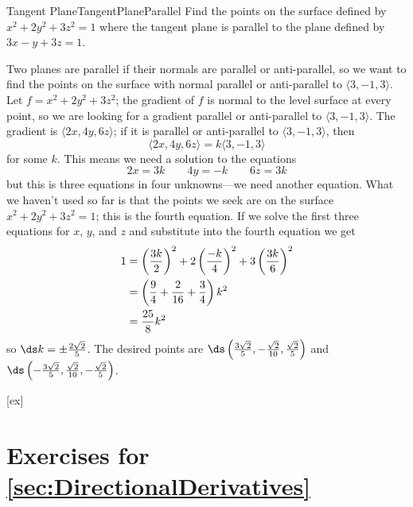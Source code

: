 \begin{example}{Tangent Plane}{TangentPlaneParallel}
Find the points on the surface defined by $x^2+2y^2+3z^2=1$
where the tangent plane  is parallel to the plane defined by
$3x-y+3z=1$.
\end{example}
\begin{solution}
Two planes are parallel if their normals are parallel or
anti-parallel, so we want to find the points on the surface with
normal parallel or anti-parallel to $\langle 3,-1,3\rangle$.
Let $f=x^2+2y^2+3z^2$; the gradient of $f$ is normal to the level
surface at every point, so we are looking for a gradient parallel 
or anti-parallel to
$\langle 3,-1,3\rangle$. The gradient is $\langle 2x,4y,6z\rangle$; if
it is parallel or anti-parallel to $\langle 3,-1,3\rangle$, then
$$\langle 2x,4y,6z\rangle=k\langle 3,-1,3\rangle$$
for some $k$. This means we need a solution to the equations
$$2x=3k\qquad 4y=-k\qquad 6z=3k$$
but this is three equations in four unknowns---we need another
equation. What we haven't used so far is that the points we seek are
on the surface $x^2+2y^2+3z^2=1$; this is the fourth equation. If we
solve the first three equations for $x$, $y$, and $z$ and substitute
into the fourth equation we get
\begin{align*}
1&=\left({3k\over2}\right)^2+2\left({-k\over4}\right)^2+3\left({3k\over6}\right)^2	\\
&=\left({9\over4}+{2\over16}+{3\over4}\right)k^2	\\
&={25\over8}k^2	\\
\end{align*}
so $\ds k=\pm{2\sqrt2\over 5}$. The desired points are
$\ds\left({3\sqrt2\over5},-{\sqrt2\over10},{\sqrt2\over 5}\right)$ 
and $\ds\left(-{3\sqrt2\over5},{\sqrt2\over10},-{\sqrt2\over
  5}\right)$.
\end{solution}


[ex]
\section*{Exercises for \ref{sec:DirectionalDerivatives}}

